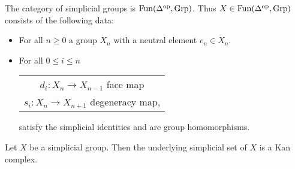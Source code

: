 \begin{defi}
    The category of simplicial groups is $\operatorname{Fun}(\Delta^{\operatorname{op}},\operatorname{Grp})$. 
    Thus $X \in \operatorname{Fun}(\Delta^{\operatorname{op}},\operatorname{Grp})$ consists of the following data:
    \begin{itemize}
        \item 
        For all $n\geq 0$ a group $X_n$ with a neutral element $e_n\in X_n$.
        \item 
        For all $0 \leq i \leq n$
        \begin{tabular}{c}
              $d_i\colon X_n \to X_{n-1}$ face map \\
              $s_i\colon X_n \to X_{n+1}$ degeneracy map,
        \end{tabular}
        satisfy the simplicial identities and are group homomorphisms.
    \end{itemize}
\end{defi}

\begin{prop}
    Let $X$ be a simplicial group. 
    Then the underlying simplicial set of $X$ is a Kan complex.
\end{prop}


